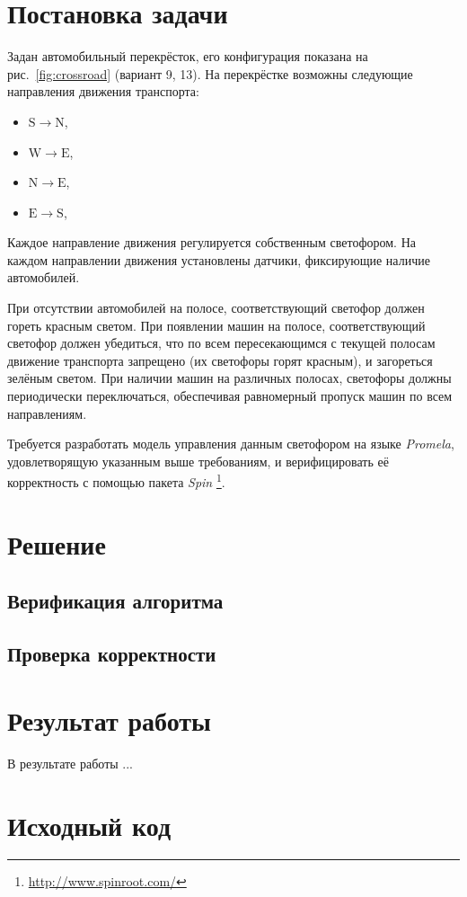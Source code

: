 \documentclass[a4paper,10pt]{article}
\begin{document}



\section{Постановка задачи}
Задан автомобильный перекрёсток, его конфигурация показана на рис.~\ref{fig:crossroad} (вариант 9, 13).
На перекрёстке возможны следующие направления движения транспорта:
\begin{itemize}
  \item $\mathrm{S} \rightarrow \mathrm{N}$,
  \item $\mathrm{W} \rightarrow \mathrm{E}$,
  \item $\mathrm{N} \rightarrow \mathrm{E}$,
  \item $\mathrm{E} \rightarrow \mathrm{S}$,
\end{itemize}
Каждое направление движения регулируется собственным светофором.
На каждом направлении движения установлены датчики, фиксирующие наличие автомобилей.

При отсутствии автомобилей на полосе, соответствующий светофор должен гореть красным светом.
При появлении машин на полосе, соответствующий светофор должен убедиться, 
что по всем пересекающимся с текущей полосам движение транспорта запрещено 
(их светофоры горят красным), и загореться зелёным светом.
При наличии машин на различных полосах, светофоры должны периодически переключаться, 
обеспечивая равномерный пропуск машин по всем направлениям.

Требуется разработать модель управления данным светофором на языке \textit{Promela}, 
удовлетворящую указанным выше требованиям, 
и верифицировать её корректность с помощью пакета \textit{Spin}%
\footnote{\url{http://www.spinroot.com/}}.

\section{Решение}


\subsection{Верификация алгоритма}


\subsection{Проверка корректности}

\section{Результат работы}
В результате работы ...

\appendix
\section{Исходный код}





\end{document}
